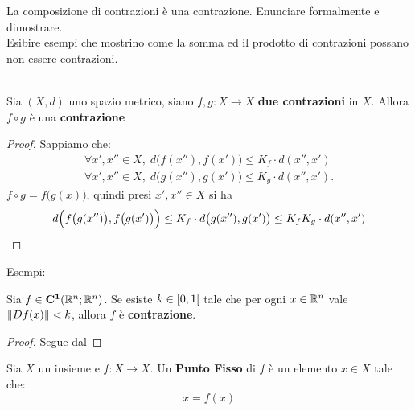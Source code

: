 \begin{exercise}
	La composizione di contrazioni è una contrazione. Enunciare formalmente e dimostrare.\\
	Esibire esempi che mostrino come la somma ed il prodotto di contrazioni possano non essere contrazioni.
	\begin{solution}\hfill\\
		Sia $(X, d)$ uno spazio metrico, siano $f,g:X \to X$ \textbf{due contrazioni} in $X$. Allora $f\circ g$ è una \textbf{contrazione}
		\begin{proof}
			\renewcommand\qedsymbol{$\square$}
			Sappiamo che:
			\begin{equation*}
				\begin{gathered}
					\forall x',x'' \in X,\; d \bigl( f(x''), f(x') \bigr) \leq K_f \cdot d(x'', x')\\
					\forall x',x'' \in X,\; d \bigl( g(x''), g(x') \bigr) \leq K_g \cdot d(x'', x').
				\end{gathered}
			\end{equation*}
			$f \circ g=f\bigl( g(x) \bigr)$, quindi presi $x',x''\in X$ si ha
			\[d \Bigl( f\bigl(g(x'')\bigr), f\bigl(g(x')\bigr) \Bigr) \leq K_f \cdot d \bigl( g(x''), g(x') \bigr) \leq K_f K_g \cdot d(x'',x')\]
		\end{proof}
		\noindent Esempi: %
	\end{solution}
\end{exercise}

\begin{proposition}
	Sia $f \in \mathbf{C^{1}}(\mathbb{R}^n;\mathbb{R}^n)$. Se esiste $k \in \left[0,1\right[$ tale che per ogni $x \in \mathbb{R}^n$ vale $\left\|Df(x)\right\| < k$, allora $f$ è \textbf{contrazione}.
	\begin{proof}
		Segue dal 
	\end{proof}
\end{proposition}

\begin{definition}
	\label{def:punto_fisso}
	Sia $X$ un insieme e $f: X \to X$. Un \textbf{Punto Fisso} di $f$ è un elemento $x \in X$ tale che:
	\[x=f(x)\]
\end{definition}

